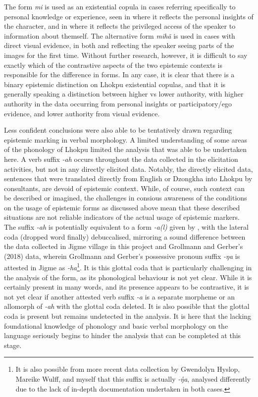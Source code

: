 The form \textit{mi} is used as an existential copula in cases referring specifically to personal knowledge or experience, seen in  where it reflects the personal insights of the character, and in  where it reflects the privileged access of the speaker to information about themself. The alternative form \textit{mihã} is used in cases with direct visual evidence, in both  and  reflecting the speaker seeing parts of the images for the first time. Without further research, however, it is difficult to say exactly which of the contrastive aspects of the two epistemic contexts is responsible for the difference in forms. In any case, it is clear that there is a binary epistemic distinction on Lhokpu existential copulas, and that it is generally speaking a distinction between higher vs lower authority, with higher authority in the data occurring from personal insights or participatory/ego evidence, and lower authority from visual evidence.

Less confident conclusions were also able to be tentatively drawn regarding epistemic marking in verbal morphology. A limited understanding of some areas of the phonology of Lhokpu limited the analysis that was able to be undertaken here. A verb suffix \textit{-ah} occurs throughout the data collected in the elicitation activities, but not in any directly elicited data. Notably, the directly elicited data, sentences that were translated directly from English or Dzongkha into Lhokpu by consultants, are devoid of epistemic context. While, of course, such context can be described or imagined, the challenges in consious awareness of the conditions on the usage of epistemic forms as discussed above mean that these described situations are not reliable indicators of the actual usage of epistemic markers. The suffix \textit{-ah} is potentially equivalent to a form \textit{-a(l)} given by \cite{Grollmann2018}, with the lateral coda (dropped word finally) debuccalised, mirroring a sound difference between the data collected in Jigme village in this project and Grollmann and Gerber's (2018) data, wherein Grollmann and Gerber's possessive pronoun suffix \textit{-ŋa} is attested in Jigme as \textit{-ha}\footnote{It is also possible from more recent data collection by Gwendolyn Hyslop, Mareike Wulff, and myself that this suffix is actually \textit{-ŋ̊a}, analysed differently due to the lack of in-depth documentation undertaken in both cases.}. It is this glottal coda that is particularly challenging in the analysis of the form, as its phonological behaviour is not yet clear. While it is certainly present in many words, and its presence appears to be contrastive, it is not yet clear if another attested verb suffix \textit{-a} is a separate morpheme or an allomorph of \textit{-ah} with the glottal coda deleted. It is also possible that the glottal coda is present but remains undetected in the analysis. It is here that the lacking foundational knowledge of phonology and basic verbal morphology on the language seriously begins to hinder the analysis that can be completed at this stage.

